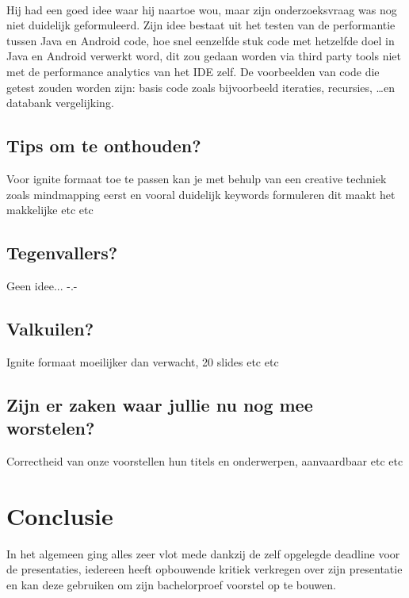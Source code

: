 \documentclass[fleqn,10pt]{voorstel}
\begin{document}
\paragraph{\cite{DeCroock2016}}
Hij had een goed idee waar hij naartoe wou, maar zijn onderzoeksvraag was nog niet duidelijk geformuleerd. 
Zijn idee bestaat uit het testen van de performantie tussen Java en Android code, hoe snel eenzelfde stuk code met hetzelfde doel in Java en Android verwerkt word, dit zou gedaan worden via third party tools niet met de performance analytics van het IDE zelf. De voorbeelden van code die getest zouden worden zijn: basis code zoals bijvoorbeeld iteraties, recursies, \dots en databank vergelijking.

\subsection{Tips om te onthouden?}
Voor ignite formaat toe te passen kan je met behulp van een creative techniek zoals mindmapping eerst en vooral 
duidelijk keywords formuleren dit maakt het makkelijke etc etc

\subsection{Tegenvallers?}
Geen idee... -.-

\subsection{Valkuilen?}
Ignite formaat moeilijker dan verwacht, 20 slides etc etc

\subsection{Zijn er zaken waar jullie nu nog mee worstelen?}
Correctheid van onze voorstellen hun titels en onderwerpen, aanvaardbaar etc etc

\section{Conclusie}
In het algemeen ging alles zeer vlot mede dankzij de zelf opgelegde deadline voor de presentaties, iedereen heeft opbouwende kritiek verkregen over zijn presentatie en kan deze gebruiken om zijn bachelorproef voorstel op te bouwen. 


\end{document}
